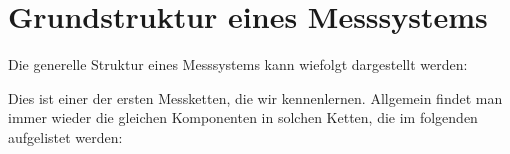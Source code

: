 \documentclass[letterpaper,10pt,english]{jupyterBook}
\begin{document}
\sphinxstepscope


\section{Grundstruktur eines Messsystems}
\label{\detokenize{content/2_Messsystem:grundstruktur-eines-messsystems}}\label{\detokenize{content/2_Messsystem::doc}}
\sphinxAtStartPar


\sphinxAtStartPar
Die generelle Struktur eines Messsystems kann wiefolgt dargestellt werden:

\sphinxAtStartPar
{}

\sphinxAtStartPar
Dies ist einer der ersten Messketten, die wir kennenlernen. Allgemein findet man immer wieder die gleichen Komponenten in solchen Ketten, die im folgenden aufgelistet werden:
\end{document}
